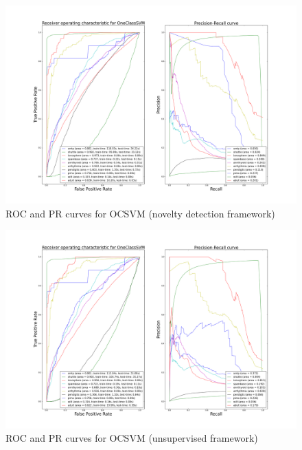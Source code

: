 \begin{figure}[!ht]
  \caption{ROC and PR curves for OCSVM (novelty detection framework)}
  \label{ocrf:fig:ocsvm_roc_pr}
  \centering
  \includegraphics[trim=175 80 175 123, clip, width=\linewidth]{fig_source/ocrf_fig/bench_ocsvm_roc_pr_supervised_factorized.png}
\end{figure}
\begin{figure}[!ht]
  \caption{ROC and PR curves for OCSVM (unsupervised framework)}
  \label{ocrf:fig:ocsvm_roc_pr_unsupervised}
  \centering
  \includegraphics[trim=175 80 175 123, clip, width=\linewidth]{fig_source/ocrf_fig/bench_ocsvm_roc_pr_unsupervised_factorized.png}
\end{figure}

